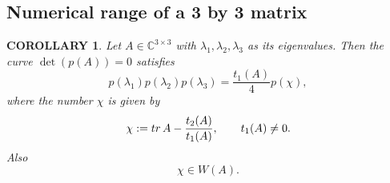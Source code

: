 \documentclass[10pt,a4paper,reqno]{amsart}
\newtheorem{dk}[defi]{\bf C\scriptsize OROLLARY \normalsize}
\newtheorem{rem}[defi]{\bf R\scriptsize EMARK \normalsize}
\def\kopr{\hfill\raisebox{3pt}{\framebox{$\star$}}}
\newenvironment{remark}{\begin{rem}\rm}{$\kopr$\end{rem}}
\newenvironment{corollary}{\begin{dk}\it}{\end{dk}}
\newcommand{\zav}[1]{\left( #1 \right)}
\newcommand{\deter}[1]{\det\zav{#1}}
\newcommand{\tr}{{\rm tr}\,}
\begin{document}
%
%
%
\subsection{Numerical range of a 3 by 3 matrix}
\begin{corollary}\label{3by3cor}
Let $A\in\mathbb{C}^{3\times 3}$ with $\lambda_1,\lambda_2,\lambda_3$ as its eigenvalues. Then the curve $\deter{p(A)}=0$ satisfies
\begin{equation}\label{covalpa3}
p(\lambda_1)p(\lambda_2)p(\lambda_3)=\frac{t_1(A)}{4}p(\chi),
\end{equation}
where the number $\chi$ is given by 
\begin{equation}\label{lambda2formula}
\chi:=\tr A-\frac{t_2(A)}{t_1(A)},\qquad t_1(A)\not=0.
\end{equation}
Also
\begin{equation}\label{chiinWA}
\chi\in W(A).
\end{equation}
\end{corollary}
\end{document}
